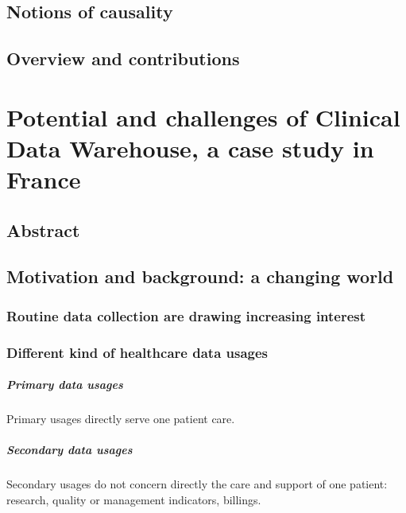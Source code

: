 \documentclass{report}
\begin{document}
\section{Notions of causality}\label{sec:intro:causality}




\section{Overview and contributions}\label{sec:intro:contributions}



\chapter{Potential and challenges of Clinical Data Warehouse, a case study in France}\label{chapter:cdw}

\section{Abstract}\label{sec:cdw:abstract}
\section{Motivation and background: a changing world}\label{sec:cdw:motivation}


\subsection{Routine data collection are drawing increasing interest}\label{chapter:cdw:routine_data_collection}

\subsection{Different kind of healthcare data usages}\label{subsec:cdw:data_usages}

\paragraph{Primary data usages}
Primary usages directly serve one patient care.

\paragraph{Secondary data usages}
Secondary usages do not concern directly the care and support of one patient: research, quality or management indicators, billings.
\end{document}
